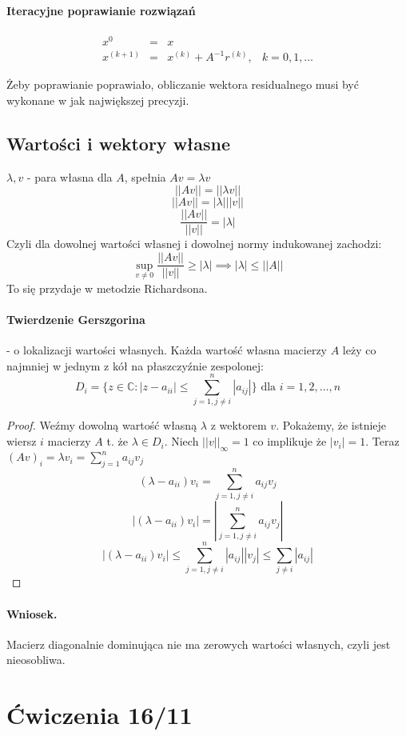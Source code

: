 \documentclass{article}
\begin{document}
\paragraph{Iteracyjne poprawianie rozwiązań}
$$\begin{matrix}
 x^{0}&=&x \\
 x^{(k+1)}&=&x^{(k)}+A^{-1}r^{(k)}, &k=0,1,\ldots 
\end{matrix}$$


Żeby poprawianie poprawiało, obliczanie wektora residualnego musi być wykonane w jak największej precyzji.
\subsection{Wartości i wektory własne}
$ \lambda, v $ - para własna dla $A$, spełnia $ Av=\lambda v $
$$||Av||=||\lambda v||$$
$$||Av||=|\lambda|||v||$$
$$\frac{||Av||}{||v||}=|\lambda|$$
Czyli dla dowolnej wartości własnej i dowolnej normy indukowanej zachodzi:
$$\sup_{v\not=0}\frac{||Av||}{||v||}\ge|\lambda|\implies |\lambda|\le||A||$$
To się przydaje w metodzie Richardsona.

\paragraph{Twierdzenie Gerszgorina} - o lokalizacji wartości własnych. Każda wartość własna macierzy $ A $ leży co najmniej w jednym z kół na płaszczyźnie zespolonej:
$$ D_i=\{z\in\mathbb{C}:|z-a_{ii}|\le \sum_{j=1, j\not=i}^{n}|a_{ij}|\} \text{ dla }  i=1,2,\ldots, n $$
\begin{proof}
	Weźmy dowolną wartość własną $ \lambda $ z wektorem $ v $. Pokażemy, że istnieje wiersz $ i $ macierzy $ A $ t. że $ \lambda\in D_i $. Niech $ ||v||_\infty=1 $ co implikuje że $ |v_i|=1 $. Teraz $ (Av)_i=\lambda v_i=\sum_{j=1}^n a_{ij}v_j $\\
	
	$$(\lambda-a_{ii}) v_i=\sum_{j=1, j\not=i}^n a_{ij}v_j$$
	$$|(\lambda-a_{ii}) v_i|=|\sum_{j=1, j\not=i}^n a_{ij}v_j|$$
	$$|(\lambda-a_{ii}) v_i|\le\sum_{j=1, j\not=i}^n|a_{ij}||v_j|\le\sum_{j\not=i}|a_{ij}|$$
\end{proof}
\paragraph{Wniosek.} Macierz diagonalnie dominująca nie ma zerowych wartości własnych, czyli jest nieosobliwa.

\section{Ćwiczenia 16/11}
\end{document}
